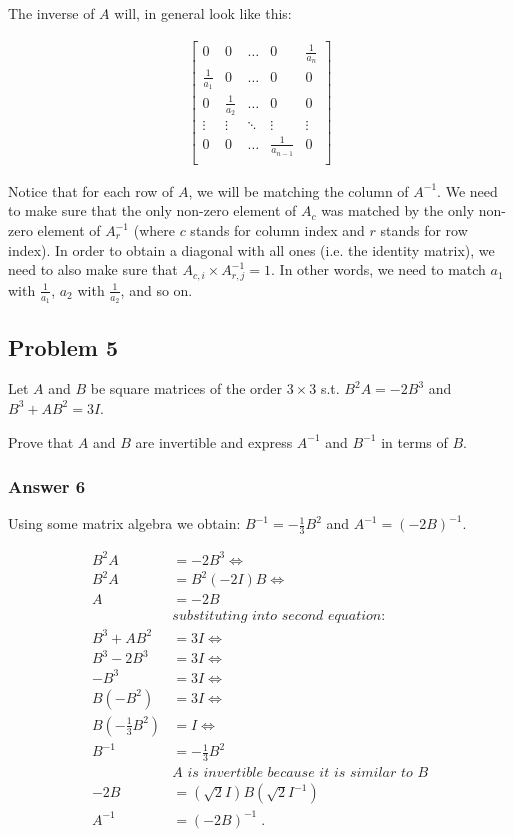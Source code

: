 \documentclass[11pt]{article}
\begin{document}
The inverse of \(A\) will, in general look like this:

\begin{align*}
  \begin{bmatrix}
    0             & 0             & \dots  & 0                & \frac{1}{a_n} \\
    \frac{1}{a_1} & 0             & \dots  & 0                & 0 \\
    0             & \frac{1}{a_2} & \dots  & 0                & 0 \\
    \vdots        & \vdots        & \ddots & \vdots           & \vdots \\
    0             & 0             & \dots  & \frac{1}{a_{n-1}} & 0 \\
  \end{bmatrix}
\end{align*}

Notice that for each row of \(A\), we will be matching the column of \(A^{-1}\).
We need to make sure that the only non-zero element of \(A_c\) was matched by
the only non-zero element of \(A^{-1}_r\) (where \(c\) stands for column index
and \(r\) stands for row index).  In order to obtain a diagonal with all ones
(i.e. the identity matrix), we need to also make sure that \(A_{c,i} \times
    A^{-1}_{r,j} = 1\).  In other words, we need to match \(a_1\) with \(\frac{1}{a_1}\),
\(a_2\) with \(\frac{1}{a_2}\), and so on.

\subsection{Problem 5}
\label{sec:orgheadline11}
Let \(A\) and \(B\) be square matrices of the order \(3 \times 3\) s.t. \(B^2A = -2B^3\)
and \(B^3 + AB^2 = 3I\).

Prove that \(A\) and \(B\) are invertible and express \(A^{-1}\) and \(B^{-1}\) in
terms of \(B\).

\subsubsection{Answer 6}
\label{sec:orgheadline10}
Using some matrix algebra we obtain: \(B^{-1} = -\frac{1}{3}B^2\) and \(A^{-1}
    = (-2B)^{-1}\).

\begin{align*}
  B^2A &= -2B^3 \iff \\
  B^2A &= B^2(-2I)B \iff \\
  A &= -2B \\
  &\textit{substituting into second equation:} \\
  B^3 + AB^2 &= 3I \iff \\
  B^3 - 2B^3 &= 3I \iff \\
  -B^3 &= 3I \iff \\
  B(-B^2) &= 3I \iff \\
  B(-\frac{1}{3}B^2) &= I \iff \\
  B^{-1} &= -\frac{1}{3}B^2 \\
  &\textit{$A$ is invertible because it is similar to $B$} \\
  -2B &= (\sqrt{2}I)B(\sqrt{2}I^{-1}) \\
  A^{-1} &= (-2B)^{-1} \;.
\end{align*}
\end{document}
